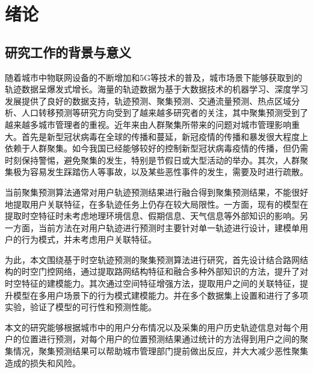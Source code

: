\documentclass[master]{thesis-uestc}
\begin{document}
\thesistableofcontents

\chapter{绪\hspace{6pt}论}

\section{研究工作的背景与意义}
随着城市中物联网设备的不断增加和5G等技术的普及，城市场景下能够获取到的轨迹数据呈爆发式增长。海量的轨迹数据为基于大数据技术的机器学习、深度学习发展提供了良好的数据支持，轨迹预测、聚集预测、交通流量预测、热点区域分析、人口转移预测等研究方向受到了越来越多研究者的关注，其中聚集预测受到了越来越多城市管理者的重视。近年来由人群聚集所带来的问题对城市管理影响重大。首先是新型冠状病毒在全球的传播和蔓延，新冠疫情的传播和暴发很大程度上依赖于人群聚集。如今我国已经能够较好的控制新型冠状病毒疫情的传播，但仍需时刻保持警惕，避免聚集的发生，特别是节假日或大型活动的举办。其次，人群聚集极为容易发生踩踏伤人等事故，以及某些恶性事件的发生，需要及时进行疏散。

当前聚集预测算法通常对用户轨迹预测结果进行融合得到聚集预测结果，不能很好地提取用户关联特征，在多轨迹任务上仍存在较大局限性。一方面，现有的模型在提取时空特征时未考虑地理环境信息、假期信息、天气信息等外部知识的影响。另一方面，当前方法在对用户轨迹进行预测时主要针对单一轨迹进行设计，建模单用户的行为模式，并未考虑用户关联特征。

为此，本文围绕基于时空轨迹预测的聚集预测算法进行研究，首先设计结合路网结构的时空门控网络，通过提取路网结构特征和融合多种外部知识的方法，提升了对时空特征的建模能力。其次通过空间特征增强方法，提取用户之间的关联特征，提升模型在多用户场景下的行为模式建模能力。并在多个数据集上设置和进行了多项实验，验证了模型的可行性和预测性能。

本文的研究能够根据城市中的用户分布情况以及采集的用户历史轨迹信息对每个用户的位置进行预测，对每个用户的位置预测结果通过统计的方法得到用户之间的聚集情况，聚集预测结果可以帮助城市管理部门提前做出反应，并大大减少恶性聚集造成的损失和风险。
\end{document}
